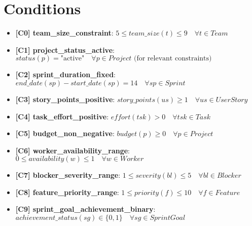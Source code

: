 \documentclass[11pt]{article}
\begin{document}
\section{Conditions}
\begin{itemize}
    \item \textbf{[C0] team\_size\_constraint}: $5 \leq team\_size(t) \leq 9 \quad \forall t \in Team$
    \item \textbf{[C1] project\_status\_active}: $status(p) = \text{"active"} \quad \forall p \in Project \text{ (for relevant constraints)}$
    \item \textbf{[C2] sprint\_duration\_fixed}: $end\_date(sp) - start\_date(sp) = 14 \quad \forall sp \in Sprint$
    \item \textbf{[C3] story\_points\_positive}: $story\_points(us) \geq 1 \quad \forall us \in UserStory$
    \item \textbf{[C4] task\_effort\_positive}: $effort(tsk) > 0 \quad \forall tsk \in Task$
    \item \textbf{[C5] budget\_non\_negative}: $budget(p) \geq 0 \quad \forall p \in Project$
    \item \textbf{[C6] worker\_availability\_range}: $0 \leq availability(w) \leq 1 \quad \forall w \in Worker$
    \item \textbf{[C7] blocker\_severity\_range}: $1 \leq severity(bl) \leq 5 \quad \forall bl \in Blocker$
    \item \textbf{[C8] feature\_priority\_range}: $1 \leq priority(f) \leq 10 \quad \forall f \in Feature$
    \item \textbf{[C9] sprint\_goal\_achievement\_binary}: $achievement\_status(sg) \in \{0, 1\} \quad \forall sg \in SprintGoal$
\end{itemize}
\end{document}
